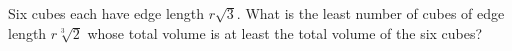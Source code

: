 Six cubes each have edge length $r\sqrt3$. What is the least number of cubes of edge length $r\sqrt[3]{2}$ whose total volume is at least the total volume of the six cubes?
